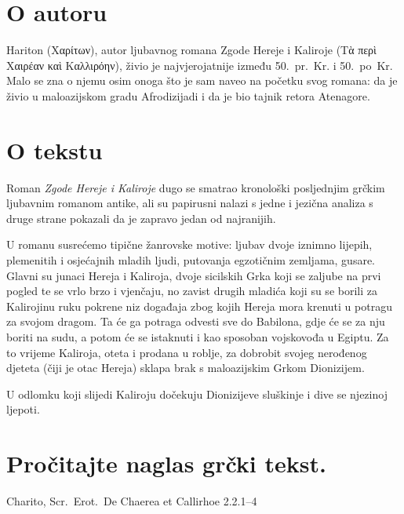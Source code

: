 \section*{O autoru}

Hariton \textgreek[variant=ancient]{(Χαρίτων),} autor ljubavnog romana Zgode Hereje i Kaliroje \textgreek[variant=ancient]{(Τὰ περὶ Χαιρέαν καὶ Καλλιρόην),} živio je najvjerojatnije između 50.\ pr.~Kr. i 50.\ po~Kr. Malo se zna o njemu osim onoga što je sam naveo na početku svog romana: da je živio u maloazijskom gradu Afrodizijadi i da je bio tajnik retora Atenagore.

\section*{O tekstu}

Roman \textit{Zgode Hereje i Kaliroje} dugo se smatrao kronološki posljednjim grčkim ljubavnim romanom antike, ali su papirusni nalazi s jedne i jezična analiza s druge strane pokazali da je zapravo jedan od najranijih. 

U romanu susrećemo tipične žanrovske motive: ljubav dvoje iznimno lijepih, plemenitih i osjećajnih mladih ljudi, putovanja egzotičnim zemljama, gusare. Glavni su junaci Hereja i Kaliroja, dvoje sicilskih Grka koji se zaljube na prvi pogled te se vrlo brzo i vjenčaju, no zavist drugih mladića koji su se borili za Kalirojinu ruku pokrene niz događaja zbog kojih Hereja mora krenuti u potragu za svojom dragom. Ta će ga potraga odvesti sve do Babilona, gdje će se za nju boriti na sudu, a potom će se istaknuti i kao sposoban vojskovođa u Egiptu. Za to vrijeme Kaliroja, oteta i prodana u roblje, za dobrobit svojeg nerođenog djeteta (čiji je otac Hereja) sklapa brak s maloazijskim Grkom Dionizijem. 

U odlomku koji slijedi Kaliroju dočekuju Dionizijeve sluškinje i dive se njezinoj ljepoti.



\section*{Pročitajte naglas grčki tekst.}

Charito, Scr.\ Erot.\ De Chaerea et Callirhoe 2.2.1–4

\medskip


